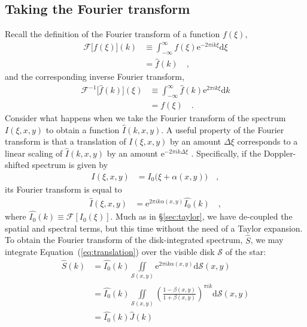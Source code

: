\documentclass[modern]{aastex62}
\begin{document}
\subsection{Taking the Fourier transform}
\label{sec:fourier}
%
Recall the definition of the Fourier transform of a function $f(\xi)$,
%
\begin{align}
    \label{eq:FT}
    \mathcal{F}\Big[f(\xi)\Big](k) 
    &\equiv
    \int_{-\infty}^\infty
        f(\xi)
        \mathrm{e}^{-2\pi i k \xi} \mathrm{d}\xi
    \nonumber \\
    &=
    \hat{f}(k)
    \quad ,
\end{align}
%
and the corresponding inverse Fourier transform,
%
\begin{align}
    \label{eq:IFT}
    \mathcal{F}^{-1}\Big[\hat{f}(k)\Big](\xi) 
    &\equiv
    \int_{-\infty}^\infty
        \hat{f}(k)
        \mathrm{e}^{2\pi i k \xi} \mathrm{d}k
    \nonumber \\
    &=
    f(\xi)
    \quad .
\end{align}
%
Consider what happens when we take the
Fourier transform of the spectrum $I(\xi, x, y)$ to obtain
a function $\hat{I}(k, x, y)$. A useful property of the
Fourier transform is that a translation of $I(\xi, x, y)$ by
an amount $\Delta\xi$ corresponds to a linear scaling
of $\hat{I}(k, x, y)$ by an amount $\mathrm{e}^{-2\pi i k \Delta\xi}$
\citep[e.g.,][]{Schoenstadt2006}.
Specifically, if the Doppler-shifted spectrum 
is given by
%
\begin{align}
    I(\xi, x, y) &= I_0\big(\xi + \alpha(x, y)\big) \quad,
\end{align}
%
its Fourier transform is equal to 
%
\begin{align}
    \label{eq:translation}
    \hat{I}(\xi, x, y) &= \mathrm{e}^{2\pi i k \alpha(x, y)}\hat{I_0}(k) \quad,
\end{align}
%
where $\hat{I_0}(k) \equiv \mathcal{F}\left[ I_0(\xi) \right]$.
%
Much as in \S\ref{sec:taylor}, we have de-coupled the spatial and spectral
terms, but this time without the need of a Taylor expansion. To obtain
the Fourier transform of the disk-integrated spectrum, $\hat{S}$, we may 
integrate Equation~(\ref{eq:translation})
over the visible disk $\mathcal{S}$ of the star:
%
\begin{align}
    \label{eq:integral_translation}
    \hat{S}(k) 
    &= 
        \hat{I_0}(k)\iint\limits_{\mathcal{S}(x, y)}
        \mathrm{e}^{2\pi i k \alpha(x, y)}
        \mathrm{d}\mathcal{S}(x, y) \nonumber \\
    &=
        \hat{I_0}(k)\iint\limits_{\mathcal{S}(x, y)}
        \left( \frac{1 - \beta(x, y)}{1 + \beta(x, y)} \right) ^ {\pi i k}
        \mathrm{d}\mathcal{S}(x, y) \nonumber \\
    &=
        \hat{I_0}(k) \hat{J}(k)
\end{align}
\end{document}
